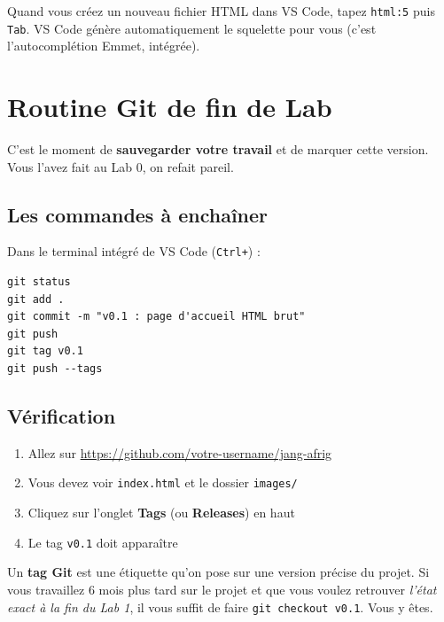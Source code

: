 \documentclass[11pt,a4paper]{article}
\newcommand{\cmark}{\ding{51}}
\begin{document}
\begin{retenirbox}
Quand vous créez un nouveau fichier HTML dans VS Code, tapez
\texttt{html:5} puis \texttt{Tab}. VS Code génère automatiquement le
squelette pour vous (c'est l'autocomplétion Emmet, intégrée).
\end{retenirbox}

\newpage

\section{Routine Git de fin de Lab}

C'est le moment de \textbf{sauvegarder votre travail} et de marquer cette
version. Vous l'avez fait au Lab 0, on refait pareil.

\subsection{Les commandes à enchaîner}

Dans le terminal intégré de VS Code (\texttt{Ctrl+\textasciigrave}) :

\begin{lstlisting}
git status
git add .
git commit -m "v0.1 : page d'accueil HTML brut"
git push
git tag v0.1
git push --tags
\end{lstlisting}

\subsection{Vérification}

\begin{enumerate}[nosep]
    \item Allez sur \url{https://github.com/votre-username/jang-afrig}
    \item Vous devez voir \texttt{index.html} et le dossier \texttt{images/}
    \item Cliquez sur l'onglet \textbf{Tags} (ou \textbf{Releases}) en haut
    \item Le tag \texttt{v0.1} doit apparaître \cmark
\end{enumerate}

\begin{retenirbox}
Un \textbf{tag Git} est une étiquette qu'on pose sur une version précise
du projet. Si vous travaillez 6 mois plus tard sur le projet et que vous
voulez retrouver \emph{l'état exact à la fin du Lab 1}, il vous suffit
de faire \texttt{git checkout v0.1}. Vous y êtes.
\end{retenirbox}
\end{document}
